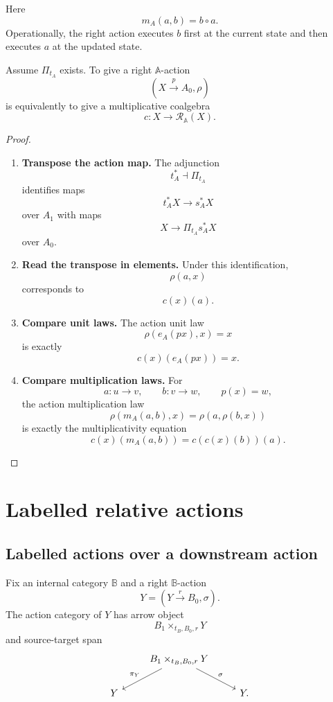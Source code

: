 Here
\[
m_A(a,b)=b\circ a.
\]
Operationally, the right action executes \(b\) first at the current state and
then executes \(a\) at the updated state.

\begin{proposition}
\label{prop:poly-relative-actions-as-response-coalgebras}
Assume \(\Pi_{t_A}\) exists.  To give a right \(\mathbb A\)-action
\[
(X\xrightarrow{p}A_0,\rho)
\]
is equivalently to give a multiplicative coalgebra
\[
c:X\to\mathcal R_{\mathbb A}(X).
\]
\end{proposition}

\begin{proof}
\leavevmode
\begin{enumerate}
\item \textbf{Transpose the action map.}
The adjunction
\[
t_A^\ast\dashv\Pi_{t_A}
\]
identifies maps
\[
t_A^\ast X\to s_A^\ast X
\]
over \(A_1\) with maps
\[
X\to\Pi_{t_A}s_A^\ast X
\]
over \(A_0\).

\item \textbf{Read the transpose in elements.}
Under this identification,
\[
\rho(a,x)
\]
corresponds to
\[
c(x)(a).
\]

\item \textbf{Compare unit laws.}
The action unit law
\[
\rho(e_A(px),x)=x
\]
is exactly
\[
c(x)(e_A(px))=x.
\]

\item \textbf{Compare multiplication laws.}
For
\[
a:u\to v,
\qquad
b:v\to w,
\qquad
p(x)=w,
\]
the action multiplication law
\[
\rho(m_A(a,b),x)=\rho(a,\rho(b,x))
\]
is exactly the multiplicativity equation
\[
c(x)(m_A(a,b))=c(c(x)(b))(a).
\]
\end{enumerate}
\end{proof}

\section{Labelled relative actions}
\label{sec:poly-relative-labelled-actions}

\subsection{Labelled actions over a downstream action}
\label{subsec:poly-relative-labelled-actions-definition}

Fix an internal category \(\mathbb B\) and a right \(\mathbb B\)-action
\[
Y=(Y\xrightarrow{r}B_0,\sigma).
\]
The action category of \(Y\) has arrow object
\[
B_1\times_{t_B,B_0,r}Y
\]
and source-target span
\[
\begin{tikzcd}
&
B_1\times_{t_B,B_0,r}Y
  \arrow[dl,"\pi_Y"']
  \arrow[dr,"\sigma"]
&
\\
Y && Y .
\end{tikzcd}
\]

